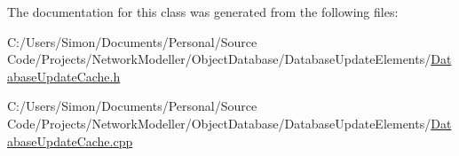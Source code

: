 The documentation for this class was generated from the following files\+:\begin{DoxyCompactItemize}
\item 
C\+:/\+Users/\+Simon/\+Documents/\+Personal/\+Source Code/\+Projects/\+Network\+Modeller/\+Object\+Database/\+Database\+Update\+Elements/\hyperlink{_database_update_cache_8h}{Database\+Update\+Cache.\+h}\item 
C\+:/\+Users/\+Simon/\+Documents/\+Personal/\+Source Code/\+Projects/\+Network\+Modeller/\+Object\+Database/\+Database\+Update\+Elements/\hyperlink{_database_update_cache_8cpp}{Database\+Update\+Cache.\+cpp}\end{DoxyCompactItemize}
